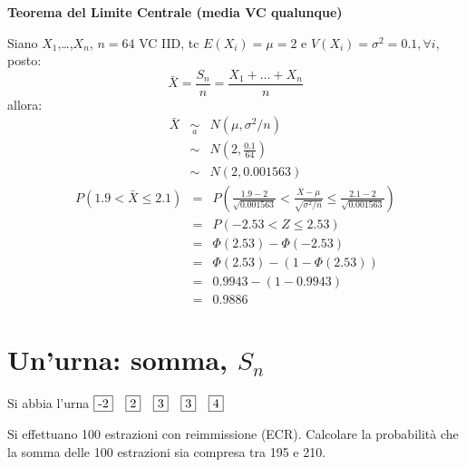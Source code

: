 \documentclass[
  11pt,
]{book}
\theoremstyle{mytheoremstyle}
\theoremstyle{mydefstyle}
\newenvironment{sol}
  {
  \begin{tcolorbox}[enhanced,breakable,arc=0.1mm,boxrule=1pt,colback=white,colframe=iblue,
  title=\bf \fontfamily{lmss}\selectfont \hspace{.5 cm} Soluzione,drop fuzzy shadow]

}{
\end{tcolorbox}
  }
\begin{document}
\begin{sol}

\textbf{Teorema del Limite Centrale (media VC qualunque)}

Siano \(X_1\),\ldots,\(X_n\), \(n=64\) VC IID, tc \(E(X_i)=\mu=2\) e \(V(X_i)=\sigma^2=0.1,\forall i\), posto:
\[
      \bar X=\frac{S_n}n =\frac{X_1 + ... + X_n}n
      \]
allora:\begin{eqnarray*}
  \bar X & \mathop{\sim}\limits_{a}& N(\mu,\sigma^2/n) \\
     &\sim & N\left(2,\frac{0.1}{64}\right) \\
     &\sim & N(2,0.001563)
  \end{eqnarray*}\begin{eqnarray*}
   P( 1.9 < \bar X \leq  2.1 ) &=& P\left( \frac { 1.9  -  2 }{\sqrt{ 0.001563 }} < \frac { \bar X  -  \mu }{ \sqrt{\sigma^2/n} } \leq \frac { 2.1  -  2 }{\sqrt{ 0.001563 }}\right)  \\
              &=& P\left(  -2.53  < Z \leq  2.53 \right) \\
              &=& \Phi( 2.53 )-\Phi( -2.53 )\\
              &=&  \Phi( 2.53 )-(1-\Phi( 2.53 )) \\ &=&  0.9943 -(1- 0.9943 ) \\ 
              &=&  0.9886 
   \end{eqnarray*}

\end{sol}

\section{\texorpdfstring{Un'urna: somma, \(S_{n}\)}{Un'urna: somma, S\_\{n\}}}\label{unurna-somma-s_n}

Si abbia l'urna \(\fbox{-2}\quad \fbox{2}\quad \fbox{3}\quad \fbox{3}\quad \fbox{4}\)

Si effettuano 100 estrazioni con reimmissione (ECR). Calcolare la
probabilità che la somma delle 100 estrazioni sia compresa tra 195 e
210.
\end{document}
